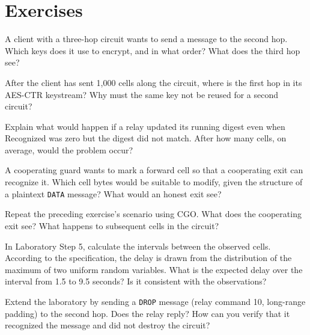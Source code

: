 \section*{Exercises}

\begin{esercizio}[1]\label{es:10-ordine}
A client with a three-hop circuit wants to send a message to the second hop. Which keys does it use to encrypt, and in what order? What does the third hop see?
\end{esercizio}

\begin{esercizio}[1]\label{es:10-contatore}
After the client has sent 1,000 cells along the circuit, where is the first hop in its AES-CTR keystream? Why must the same key not be reused for a second circuit?
\end{esercizio}

\begin{esercizio}[2]\label{es:10-falso}
Explain what would happen if a relay updated its running digest even when Recognized was zero but the digest did not match. After how many cells, on average, would the problem occur?
\end{esercizio}

\begin{esercizio}[2]\label{es:10-tag}
A cooperating guard wants to mark a forward cell so that a cooperating exit can recognize it. Which cell bytes would be suitable to modify, given the structure of a plaintext \texttt{DATA} message? What would an honest exit see?
\end{esercizio}

\begin{esercizio}[2]\label{es:10-cgo-tag}
Repeat the preceding exercise's scenario using CGO. What does the cooperating exit see? What happens to subsequent cells in the circuit?
\end{esercizio}

\begin{esercizio}[2]\label{es:10-padding}
In Laboratory Step 5, calculate the intervals between the observed  cells. According to the specification, the delay is drawn from the distribution of the maximum of two uniform random variables. What is the expected delay over the interval from 1.5 to 9.5 seconds? Is it consistent with the observations?
\end{esercizio}

\begin{esercizio}[3]\label{es:10-drop}
Extend the laboratory by sending a \texttt{DROP} message (relay command 10, long-range padding) to the second hop. Does the relay reply? How can you verify that it recognized the message and did not destroy the circuit?
\end{esercizio}

